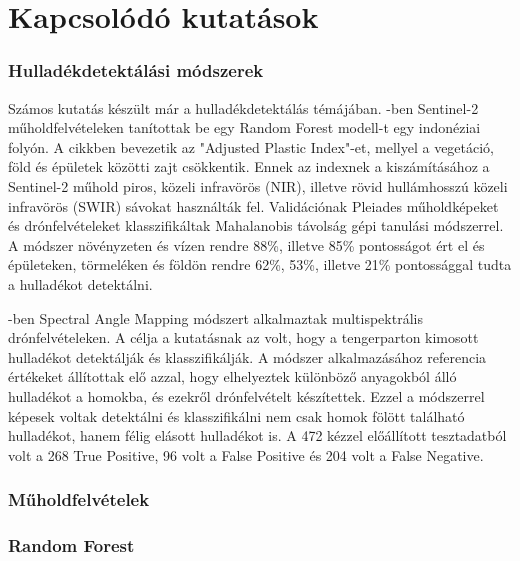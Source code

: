 \chapter{Kapcsolódó kutatások}
\label{ch:related_research}

\subsection{Hulladékdetektálási módszerek}

Számos kutatás készült már a hulladékdetektálás témájában. \cite{sakti2023}-ben Sentinel-2 műholdfelvételeken tanítottak be egy Random Forest modell-t egy indonéziai folyón. A cikkben bevezetik az "Adjusted Plastic Index"-et, mellyel a vegetáció, föld és épületek közötti zajt csökkentik. Ennek az indexnek a kiszámításához a Sentinel-2 műhold piros, közeli infravörös (NIR), illetve rövid hullámhosszú közeli infravörös (SWIR) sávokat használták fel. Validációnak Pleiades műholdképeket és drónfelvételeket klasszifikáltak Mahalanobis távolság gépi tanulási módszerrel. A módszer növényzeten és vízen rendre 88\%, illetve 85\% pontosságot ért el és épületeken, törmeléken és földön rendre 62\%, 53\%, illetve 21\% pontossággal tudta a hulladékot detektálni.

\cite{goncalves2022}-ben Spectral Angle Mapping módszert alkalmaztak multispektrális drónfelvételeken. A célja a kutatásnak az volt, hogy a tengerparton kimosott hulladékot detektálják és klasszifikálják. A módszer alkalmazásához referencia értékeket állítottak elő azzal, hogy elhelyeztek különböző anyagokból álló hulladékot a homokba, és ezekről drónfelvételt készítettek. Ezzel a módszerrel képesek voltak detektálni és klasszifikálni nem csak homok fölött található hulladékot, hanem félig elásott hulladékot is. A 472 kézzel előállított tesztadatból volt a 268 True Positive, 96 volt a False Positive és 204 volt a False Negative.

\subsection{Műholdfelvételek}

\subsection{Random Forest}

